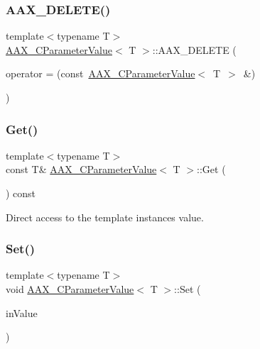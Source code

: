 \mbox{\label{a01533_ac63dcc7a4774d7518e9651dda9012c2e}} 
\subsubsection{\texorpdfstring{AAX\_DELETE()}{AAX\_DELETE()}}
{\footnotesize\ttfamily template$<$typename T$>$ \\
\mbox{\hyperlink{a01533}{A\+A\+X\+\_\+\+C\+Parameter\+Value}}$<$ T $>$\+::A\+A\+X\+\_\+\+D\+E\+L\+E\+TE (\begin{DoxyParamCaption}\item[{\mbox{\hyperlink{a01533}{A\+A\+X\+\_\+\+C\+Parameter\+Value}}$<$ T $>$ \&}]{operator = {\ttfamily (const~\mbox{\hyperlink{a01533}{A\+A\+X\+\_\+\+C\+Parameter\+Value}}$<$~T~$>$~\&)} }\end{DoxyParamCaption})}

\mbox{\label{a01533_abdffd43e04bd6cadb2ea4ab48991116c}} 
\subsubsection{\texorpdfstring{Get()}{Get()}}
{\footnotesize\ttfamily template$<$typename T$>$ \\
const T\& \mbox{\hyperlink{a01533}{A\+A\+X\+\_\+\+C\+Parameter\+Value}}$<$ T $>$\+::Get (\begin{DoxyParamCaption}{ }\end{DoxyParamCaption}) const\hspace{0.3cm}{\ttfamily [inline]}}



Direct access to the template instance\textquotesingle{}s value. 

\mbox{\label{a01533_a72303342bc5133e039264549f3c44d87}} 
\subsubsection{\texorpdfstring{Set()}{Set()}}
{\footnotesize\ttfamily template$<$typename T$>$ \\
void \mbox{\hyperlink{a01533}{A\+A\+X\+\_\+\+C\+Parameter\+Value}}$<$ T $>$\+::Set (\begin{DoxyParamCaption}\item[{const T \&}]{in\+Value }\end{DoxyParamCaption})\hspace{0.3cm}{\ttfamily [inline]}}



